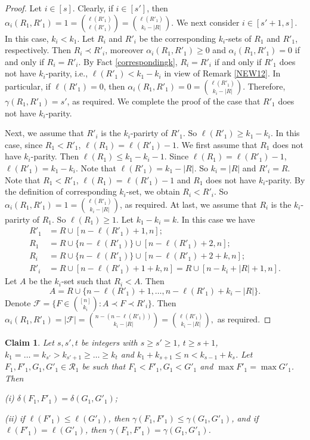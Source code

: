 \documentclass[a4paper,11pt]{article}
\newtheorem{claim}[theorem]{Claim}
\begin{document}
\begin{proof}
Let  $i\in [s]$.
Clearly, if $i\in [s']$, then $\alpha_i(R_1, R'_1)=1={\ell(R'_1)\choose \ell(R'_1)}={\ell(R'_1)\choose k_i-|R|}$.
We next consider  $i\in[s'+1, s]$. In this case, $k_i<k_1$.
Let $R_i$ and $R'_i$ be the corresponding $k_i$-sets of $R_1$ and $R'_1$, respectively.  Then $R_i\prec R'_i$, moreover $\alpha_i(R_1, R'_1) \geq 0$ and  $\alpha_i(R_1, R'_1)=0$ if and only if $R_i=R'_i$. By Fact \ref{correspondingk}, $R_i=R'_i$ if and only if $R'_1$ does not have $k_i$-parity, i.e., $\ell(R'_1)< k_1-k_i$ in view of Remark \ref{NEW12}.
In particular, if $\ell(R'_1)=0$, then $\alpha_i(R_1, R'_1)=0={\ell(R'_1)\choose k_i-|R|}$. Therefore, $\gamma(R_1, R'_1)=s'$,
as required. We complete the proof of the case that $R'_1$ does not have $k_i$-parity.

Next, we assume that $R'_i$ is the $k_i$-parirty of $R'_1$. So $\ell(R'_1)\geq k_1-k_i$. In this case,
since $R_1<R'_1$, $\ell(R_1)=\ell(R'_1)-1$. We first assume that $R_1$ does not have $k_i$-parity. Then $\ell(R_1)\leq k_1-k_i-1$.
Since $\ell(R_1)=\ell(R'_1)-1$,
$\ell(R'_1)= k_1-k_i$. Note that $\ell(R'_1)=k_1-|R|$. So $k_i=|R|$ and $R'_i=R$. Note that $R_1<R'_1$,  $\ell(R_1)=\ell(R'_1)-1$ and $R_1$ does not have $k_i$-parity. By the definition of corresponding $k_i$-set, we obtain $R_i<R'_i$. So
$\alpha_i(R_1, R'_1)=1={\ell(R'_1)\choose k_i-|R|}$, as required.
At last, we  assume that $R_i$ is the $k_i$-parirty of $R_1$. So $\ell(R_1)\geq 1$.
Let $k_1-k_i=k$.
In this case we have
\begin{align*}
R'_1&=R\cup [n-\ell(R'_1)+1, n];\\
R_1&=R\cup \{n-\ell(R'_1)\} \cup [n-\ell(R'_1)+2, n];\\
R_i&=R\cup \{n-\ell(R'_1)\}\cup [n-\ell(R'_1)+2+k, n];\\
R'_i&=R\cup [n-\ell(R'_1)+1+k, n]=R\cup [n-k_i+|R|+1, n].
\end{align*}
Let $A$ be the $k_i$-set such that $R_i<A$.
Then
$$A=R\cup \{n-\ell(R'_1)+1, \dots, n-\ell(R'_1)+k_i-|R|\}.$$
Denote $\mathcal{F}=\{F\in {[n]\choose k_i}: A\prec F\prec R'_i\}.$
Then
$
\alpha_i(R_1, R'_1)=|\mathcal{F}|={n-(n-\ell(R'_1))\choose k_i-|R|}={\ell(R'_1)\choose k_i-|R|},
$
as required.
\end{proof}



\begin{claim}\label{0000}
Let $s, s', t$ be integers with $s\geq s'\geq 1$, $t\geq s+1$, $k_1=\dots=k_{s'}> k_{s'+1}\geq\dots\geq k_t$ and $k_1+k_{s+1}\leq n <k_{s-1}+k_s$.
Let  $F_1, F'_1, G_1, G'_1\in \mathcal{R}_1$ be such that $F_1<F'_1, G_1<G'_1$ and  $\max F'_1=\max G'_1$.
Then

(i) $\delta(F_1, F'_1)=\delta(G_1, G'_1)$;

(ii) if $\ell(F'_1)\leq \ell(G'_1)$, then $\gamma(F_1, F'_1)\leq \gamma(G_1, G'_1)$, and if $\ell(F'_1)= \ell(G'_1)$, then $\gamma(F_1, F'_1)=\gamma(G_1, G'_1)$.
\end{claim}
\end{document}
